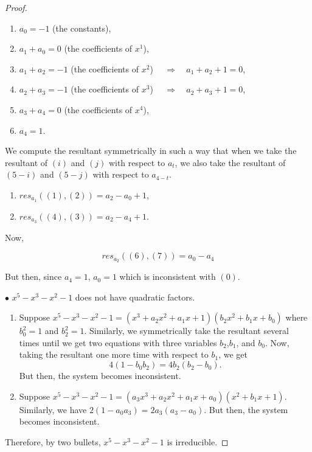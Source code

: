 \documentclass[10pt,a4paper]{amsart}
\begin{document}
\begin{proof}
\begin{enumerate}
\begin{enumerate}
\item[(0)] $a_0=-1$ (the constants), \\
\item[(1)] $a_1+ a_0=0$ (the coefficients of $x^1$), \\
\item[(2)] $a_1+a_2=-1$ (the coefficients of $x^2$) $\quad \Rightarrow \quad a_1+a_2+1=0$,\\
\item[(3)] $a_2+a_3=-1$ (the coefficients of $x^3$) $\quad \Rightarrow \quad a_2+a_3+1=0$, \\
\item[(4)] $a_3+a_4=0$ (the coefficients of $x^4$), \\
\item[(5)] $a_4=1$.
\end{enumerate}


We compute the resultant symmetrically in such a way that when we take the resultant of $(i)$ and $(j)$ with respect to $a_{t}$, we also take the resultant of $(5-i)$ and $(5-j)$ with respect to $a_{4-t}$.

\begin{enumerate}
\item[(6)] $res_{a_1}((1),(2))=a_2-a_0+1$,
\item[(7)] $res_{a_3}((4),(3))=a_2-a_4+1$.
\end{enumerate}

Now,

\begin{equation*}
res_{a_2}((6),(7))=a_0-a_4
\end{equation*}

But then, since $a_4=1$, $a_0=1$ which is inconsistent with $(0)$.

\end{enumerate} 

$\bullet$ $x^5-x^3-x^2-1$ does not have quadratic factors.
\begin{enumerate} 
\item[I.] Suppose $x^5-x^3-x^2-1=(x^3+a_2 x^2+a_1 x+1)(b_2 x^2+b_1 x+b_0)$ where $b_0^2=1$ and $b_2^2=1$.
Similarly, we symmetrically take the resultant several times until we get two equations with three variables $b_2$,$b_1$, and $b_0$.
Now, taking the resultant one more time with respect to $b_1$, we get
 \begin{equation*}
 4(1-b_0 b_2)=4b_2(b_2-b_0) .
\end{equation*}
But then, the system becomes inconsistent.
\item[II.] Suppose $x^5-x^3-x^2-1=(a_3 x^3+a_2 x^2+a_1 x+a_0)(x^2+b_1 x+1)$.
Similarly, we have $2(1-a_0 a_3)=2a_3(a_3-a_0).$
But then, the system becomes inconsistent.
\end{enumerate}

Therefore, by two bullets, $x^5-x^3-x^2-1$ is irreducible.
\end{proof}
\end{document}
